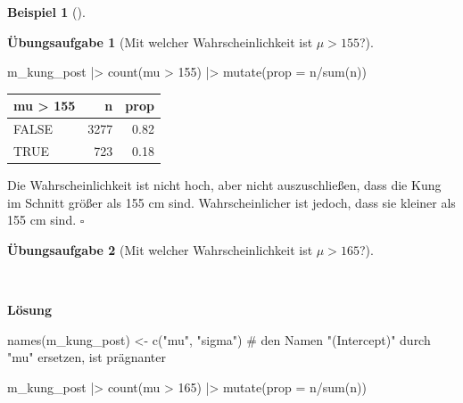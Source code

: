 \documentclass[
  ngerman,
  letterpaper,
  twoside,
  open=any]{scrbook}
\newenvironment{Shaded}{\begin{snugshade}}{\end{snugshade}}
\newcommand{\AttributeTok}[1]{\textcolor[rgb]{0.40,0.45,0.13}{#1}}
\newcommand{\CommentTok}[1]{\textcolor[rgb]{0.37,0.37,0.37}{#1}}
\newcommand{\DecValTok}[1]{\textcolor[rgb]{0.68,0.00,0.00}{#1}}
\newcommand{\FunctionTok}[1]{\textcolor[rgb]{0.28,0.35,0.67}{#1}}
\newcommand{\NormalTok}[1]{\textcolor[rgb]{0.00,0.23,0.31}{#1}}
\newcommand{\OtherTok}[1]{\textcolor[rgb]{0.00,0.23,0.31}{#1}}
\newcommand{\SpecialCharTok}[1]{\textcolor[rgb]{0.37,0.37,0.37}{#1}}
\newcommand{\StringTok}[1]{\textcolor[rgb]{0.13,0.47,0.30}{#1}}
\newcounter{none} %
\theoremstyle{definition}
\newtheorem{example}{Beispiel}[chapter]
\theoremstyle{plain}
\theoremstyle{definition}
\newtheorem{exercise}{Übungsaufgabe}[chapter]
\theoremstyle{definition}
\theoremstyle{remark}
\begin{document}
\begin{example}[]
\begin{exercise}[Mit welcher Wahrscheinlichkeit ist
\(\mu>155\)?]
\begin{tcolorbox}[enhanced jigsaw, arc=.35mm, bottomrule=.15mm, breakable, colback=white, colframe=quarto-callout-tip-color-frame, left=2mm, leftrule=.75mm, opacityback=0, rightrule=.15mm, toprule=.15mm]
\begin{Shaded}
\begin{Highlighting}[]
\NormalTok{m\_kung\_post }\SpecialCharTok{|\textgreater{}} 
  \FunctionTok{count}\NormalTok{(mu }\SpecialCharTok{\textgreater{}} \DecValTok{155}\NormalTok{) }\SpecialCharTok{|\textgreater{}} 
  \FunctionTok{mutate}\NormalTok{(}\AttributeTok{prop =}\NormalTok{ n}\SpecialCharTok{/}\FunctionTok{sum}\NormalTok{(n))}
\end{Highlighting}
\end{Shaded}

{\def\LTcaptype{none} %
\begin{longtable}[]{@{}lrr@{}}
\toprule\noalign{}
mu \textgreater{} 155 & n & prop \\
\midrule\noalign{}
\endhead
\bottomrule\noalign{}
\endlastfoot
FALSE & 3277 & 0.82 \\
TRUE & 723 & 0.18 \\
\end{longtable}
}

Die Wahrscheinlichkeit ist nicht hoch, aber nicht auszuschließen, dass
die Kung im Schnitt größer als 155 cm sind. Wahrscheinlicher ist jedoch,
dass sie kleiner als 155 cm sind. \(\square\)

\end{tcolorbox}

\end{exercise}

\begin{exercise}[Mit welcher Wahrscheinlichkeit ist
\(\mu>165\)?]\protect\hypertarget{exr-kung2}{}\label{exr-kung2}

~

\begin{tcolorbox}[enhanced jigsaw, arc=.35mm, bottomrule=.15mm, breakable, colback=white, colframe=quarto-callout-tip-color-frame, left=2mm, leftrule=.75mm, opacityback=0, rightrule=.15mm, toprule=.15mm]

\vspace{-3mm}\textbf{Lösung}\vspace{3mm}

\begin{Shaded}
\begin{Highlighting}[]
\FunctionTok{names}\NormalTok{(m\_kung\_post) }\OtherTok{\textless{}{-}} 
  \FunctionTok{c}\NormalTok{(}\StringTok{"mu"}\NormalTok{, }\StringTok{"sigma"}\NormalTok{)  }\CommentTok{\# den Namen "(Intercept)" durch "mu" ersetzen, ist prägnanter}

\NormalTok{m\_kung\_post }\SpecialCharTok{|\textgreater{}} 
  \FunctionTok{count}\NormalTok{(mu }\SpecialCharTok{\textgreater{}} \DecValTok{165}\NormalTok{) }\SpecialCharTok{|\textgreater{}} 
  \FunctionTok{mutate}\NormalTok{(}\AttributeTok{prop =}\NormalTok{ n}\SpecialCharTok{/}\FunctionTok{sum}\NormalTok{(n))}
\end{Highlighting}
\end{Shaded}


\end{tcolorbox}
\end{exercise}
\end{example}
\end{document}
